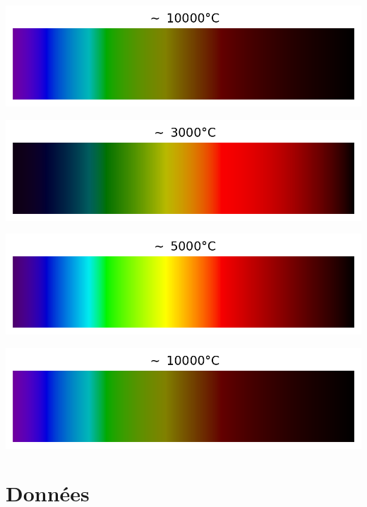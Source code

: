 \documentclass[12pt,a4paper,fleqn]{article}
\begin{document}
\begin{landscape}
\begin{center}
\begin{multicols}{3}
\includegraphics[width=\linewidth]{images/spectrum_black_body_temp10000K.png}
\end{multicols}
\end{center}

\begin{center}
\begin{multicols}{3}
\includegraphics[width=\linewidth]{images/spectrum_black_body_temp3000K.png}

\includegraphics[width=\linewidth]{images/spectrum_black_body_temp5000K.png}

\includegraphics[width=\linewidth]{images/spectrum_black_body_temp10000K.png}
\end{multicols}
\end{center}

\end{landscape}

\section*{Données}
\end{document}
